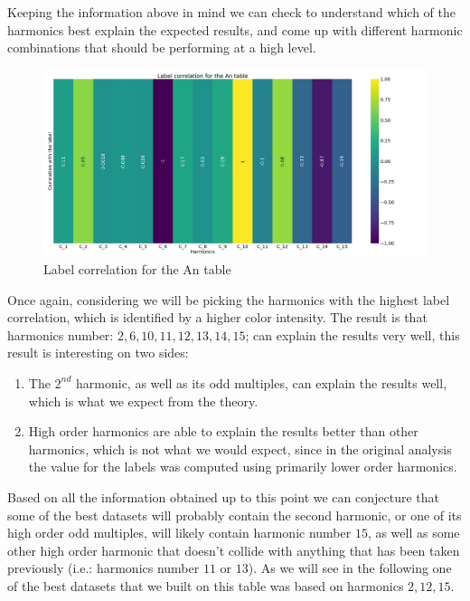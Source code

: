 Keeping the information above in mind we can check  to understand which of the
harmonics best explain the expected results, and come up with different harmonic combinations that
should be performing at a high level.

\begin{figure}
	\centering
	\includegraphics[scale=.2]{img/An_label_corr.png}
	\caption{Label correlation for the An table} \label{fig:an-lcorr}
\end{figure}

Once again, considering  we will be picking the harmonics with the highest label
correlation, which is identified by a higher color intensity. The result
is that harmonics number: $2, 6, 10, 11, 12, 13, 14, 15$; can explain the results very well, this
result is interesting on two sides:
\begin{enumerate}
	\item The $2^{nd}$ harmonic, as well as its odd multiples, can explain the results well, which
	      is what we expect from the theory.
	\item High order harmonics are able to explain the results better than other harmonics,
	      which is not what we would expect, since in the original analysis the value for the
	      labels was computed using primarily lower order harmonics.
\end{enumerate}
Based on all the information obtained up to this point we can conjecture that some of the best
datasets will probably contain the second harmonic, or one of its high order odd multiples, will
likely contain harmonic number $15$, as well as some other high order harmonic that doesn't collide
with anything that has been taken previously (i.e.: harmonics number $11$ or $13$). As we will see
in the following one of the best datasets that we built on this table was based on harmonics $2, 12,
	15$.

